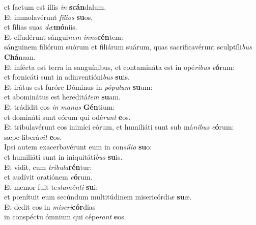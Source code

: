 \evenverse et factum est illis \textit{in} \textbf{scán}dalum.\\
\oddverse Et immolavérunt \textit{fí}\textit{li}\textit{os} \textbf{su}os,~\*\\
\oddverse et fílias suas \textit{dæ}\textbf{mó}niis.\\
\evenverse Et effudérunt sángui\textit{nem} \textit{in}\textit{no}\textbf{cén}tem:~\*\\
\evenverse sánguinem filiórum suórum et filiárum suárum, quas sacrificavérunt sculptíli\textit{bus} \textbf{Chá}naan.\\
\oddverse Et infécta est terra in sanguínibus, et contamináta est in opé\textit{ri}\textit{bus} \textit{e}\textbf{ó}rum:~\*\\
\oddverse et fornicáti sunt in adinventióni\textit{bus} \textbf{su}is.\\
\evenverse Et irátus est furóre Dóminus in \textit{pó}\textit{pu}\textit{lum} \textbf{su}um:~\*\\
\evenverse et abominátus est hereditá\textit{tem} \textbf{su}am.\\
\oddverse Et trádidit eos \textit{in} \textit{ma}\textit{nus} \textbf{Gén}tium:~\*\\
\oddverse et domináti sunt eórum qui odé\textit{runt} \textbf{e}os.\\
\evenverse Et tribulavérunt eos inimíci eórum, et humiliáti sunt sub má\textit{ni}\textit{bus} \textit{e}\textbf{ó}rum:~\*\\
\evenverse sæpe liberá\textit{vit} \textbf{e}os.\\
\oddverse Ipsi autem exacerbavérunt eum in con\textit{sí}\textit{li}\textit{o} \textbf{su}o:~\*\\
\oddverse et humiliáti sunt in iniquitáti\textit{bus} \textbf{su}is.\\
\evenverse Et vidit, cum \textit{tri}\textit{bu}\textit{la}\textbf{rén}tur:~\*\\
\evenverse et audívit oratiónem \textit{e}\textbf{ó}rum.\\
\oddverse Et memor fuit te\textit{sta}\textit{mén}\textit{ti} \textbf{su}i:~\*\\
\oddverse et pœnítuit eum secúndum multitúdinem misericórdi\textit{æ} \textbf{su}æ.\\
\evenverse Et dedit eos in \textit{mi}\textit{se}\textit{ri}\textbf{cór}dias~\*\\
\evenverse in conspéctu ómnium qui cépe\textit{rant} \textbf{e}os.\\
